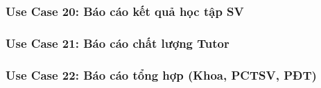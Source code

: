 \newpage
\subsubsection*{Use Case 20: Báo cáo kết quả học tập SV}
\begin{samepage}

\end{samepage}


\newpage
\subsubsection*{Use Case 21: Báo cáo chất lượng Tutor}
\begin{samepage}

\end{samepage}


\newpage
\subsubsection*{Use Case 22: Báo cáo tổng hợp (Khoa, PCTSV, PĐT)}
\begin{samepage}

\end{samepage}

